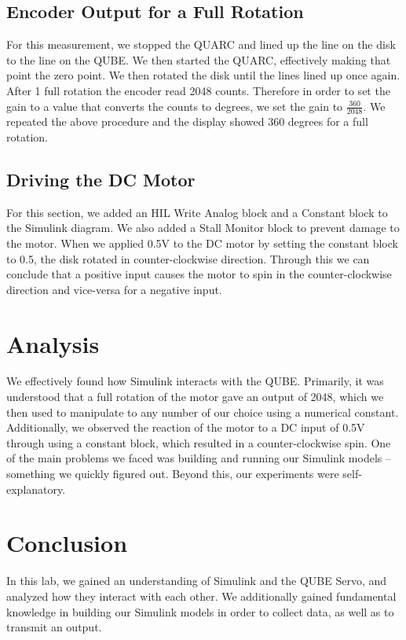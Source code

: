 \documentclass[letterpaper, 10 pt,onecolumn]{article}
\begin{document}
\subsection{Encoder Output for a Full Rotation}
For this measurement, we stopped the QUARC and lined up the line on the disk to the line on the QUBE. We then started the QUARC, effectively making that point the zero point. We then rotated the disk until the lines lined up once again. After 1 full rotation the encoder read 2048 counts. Therefore in order to set the gain to a value that converts the counts to degrees, we set the gain to $\frac{360}{2048}$. We repeated the above procedure and the display showed 360 degrees for a full rotation. 
\subsection{Driving the DC Motor}
For this section, we added an HIL Write Analog block and a Constant block to the Simulink diagram. We also added a Stall Monitor block to prevent damage to the motor. When we applied 0.5V to the DC motor by setting the constant block to 0.5, the disk rotated in counter-clockwise direction. Through this we can conclude that a positive input causes the motor to spin in the counter-clockwise direction and vice-versa for a negative input. 

\section{Analysis}
We effectively found how Simulink interacts with the QUBE. Primarily, it was understood that a full rotation of the motor gave an output of 2048, which we then used to manipulate to any number of our choice using a numerical constant. Additionally, we observed the reaction of the motor to a DC input of 0.5V through using a constant block, which resulted in a counter-clockwise spin. One of the main problems we faced was building and running our Simulink models \--- something we quickly figured out. Beyond this, our experiments were self-explanatory.

\section{Conclusion}
In this lab, we gained an understanding of Simulink and the QUBE Servo, and analyzed how they interact with each other. We additionally gained fundamental knowledge in building our Simulink models in order to collect data, as well as to transmit an output.
\end{document}
